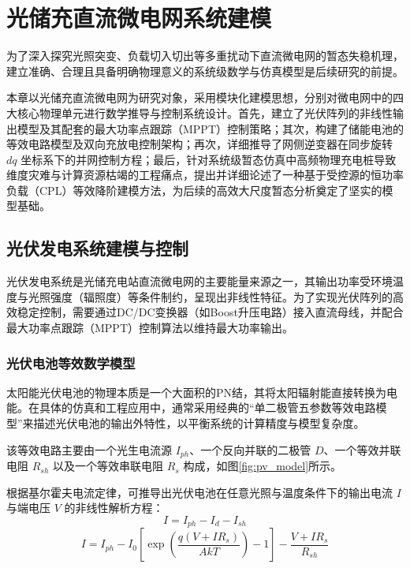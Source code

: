 \section{光储充直流微电网系统建模}

为了深入探究光照突变、负载切入切出等多重扰动下直流微电网的暂态失稳机理，建立准确、合理且具备明确物理意义的系统级数学与仿真模型是后续研究的前提。

本章以光储充直流微电网为研究对象，采用模块化建模思想，分别对微电网中的四大核心物理单元进行数学推导与控制系统设计。首先，建立了光伏阵列的非线性输出模型及其配套的最大功率点跟踪（MPPT）控制策略；其次，构建了储能电池的等效电路模型及双向充放电控制架构；再次，详细推导了网侧逆变器在同步旋转 $dq$ 坐标系下的并网控制方程；最后，针对系统级暂态仿真中高频物理充电桩导致维度灾难与计算资源枯竭的工程痛点，提出并详细论述了一种基于受控源的恒功率负载（CPL）等效降阶建模方法，为后续的高效大尺度暂态分析奠定了坚实的模型基础。

\subsection{光伏发电系统建模与控制}

光伏发电系统是光储充电站直流微电网的主要能量来源之一，其输出功率受环境温度与光照强度（辐照度）等条件制约，呈现出非线性特征。为了实现光伏阵列的高效稳定控制，需要通过DC/DC变换器（如Boost升压电路）接入直流母线，并配合最大功率点跟踪（MPPT）控制算法以维持最大功率输出。

\subsubsection{光伏电池等效数学模型}

太阳能光伏电池的物理本质是一个大面积的PN结，其将太阳辐射能直接转换为电能。在具体的仿真和工程应用中，通常采用经典的“单二极管五参数等效电路模型”来描述光伏电池的输出外特性，以平衡系统的计算精度与模型复杂度。

该等效电路主要由一个光生电流源 $I_{ph}$、一个反向并联的二极管 $D$、一个等效并联电阻 $R_{sh}$ 以及一个等效串联电阻 $R_s$ 构成，如图\ref{fig:pv_model}所示。


根据基尔霍夫电流定律，可推导出光伏电池在任意光照与温度条件下的输出电流 $I$ 与端电压 $V$ 的非线性解析方程：
\begin{equation}
    I = I_{ph} - I_{d} - I_{sh}
\end{equation}
\begin{equation}
    I = I_{ph} - I_0 \left[ \exp\left( \frac{q(V + I R_s)}{A k T} \right) - 1 \right] - \frac{V + I R_s}{R_{sh}}
\end{equation}

